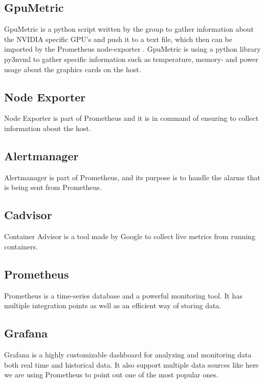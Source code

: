 \documentclass[../main.tex]{subfiles}
\begin{document}
\subsection*{GpuMetric}
GpuMetric is a python script written by the group to gather information about the NVIDIA specific GPU's and push it to a text file, which then can be imported by the Prometheus \cite{prometheus} node-exporter \cite{nodeexporter}. GpuMetric is  using a python library py3nvml \citep{py3nvml} to gather specific information such as temperature, memory- and power usage  about the graphics cards on the host.   %

\subsection*{Node Exporter}
Node Exporter is part of Prometheus and it is in command of ensuring to collect information about the host.

\subsection*{Alertmanager}
Alertmanager \cite{alertmanager} is part of Prometheus, and its purpose is to handle the alarms that is being sent from Prometheus. 

\subsection*{Cadvisor}
Container Advisor \cite{cadvisor} is a tool made by Google to collect live metrics from running containers. %

\subsection*{Prometheus}
Prometheus is a time-series database and a powerful monitoring tool. It has multiple integration points as well as an efficient way of storing data.

\subsection*{Grafana}
Grafana is a highly customizable dashboard for analyzing and monitoring data both real time and historical data. It also support multiple data sources like here we are using Prometheus to point out one of the most popular ones. 
\end{document}
